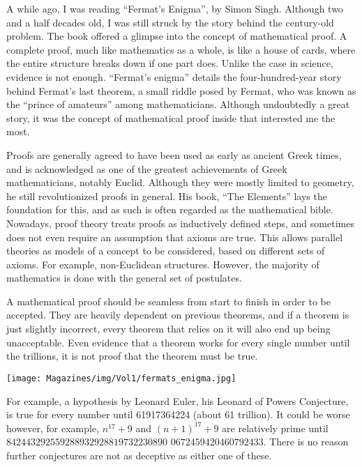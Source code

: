 \documentclass{article}
\begin{document}
\begin{multicols}{3}

A while ago, I was reading “Fermat’s Enigma”, by Simon Singh. Although two and a half decades old, I was still struck by the story behind the century-old problem. The book offered a glimpse into the concept of mathematical proof. A complete proof, much like mathematics as a whole, is like a house of cards, where the entire structure breaks down if one part does. Unlike the case in science, evidence is not enough. “Fermat’s enigma” details the four-hundred-year story behind Fermat’s last theorem, a small riddle posed by Fermat, who was known as the “prince of amateurs” among mathematicians. Although undoubtedly a great story, it was the concept of mathematical proof inside that interested me the most.

Proofs are generally agreed to have been used as early as ancient Greek times, and is acknowledged as one of the greatest achievements of Greek mathematicians, notably Euclid. Although they were mostly limited to geometry, he still revolutionized proofs in general. His book, “The Elements” lays the foundation for this, and as such is often regarded as the mathematical bible. Nowadays, proof theory treats proofs as inductively defined steps, and sometimes does not even require an assumption that axioms are true. This allows parallel theories as models of a concept to be considered, based on different sets of axioms. For example, non-Euclidean structures. However, the majority of mathematics is done with the general set of postulates.

 
A mathematical proof should be seamless from start to finish in order to be accepted. They are heavily dependent on previous theorems, and if a theorem is just slightly incorrect, every theorem that relies on it will also end up being unacceptable. Even evidence that a theorem works for every single number until the trillions, it is not proof that the theorem must be true.
\begin{center}
   \texttt{[image: Magazines/img/Vol1/fermats\_enigma.jpg]}
\end{center}
For example, a hypothesis by Leonard Euler, his Leonard of Powers Conjecture, is true for every number until 61917364224 (about 61 trillion). It could be worse however, for example, $n^{17}+9$ and $(n+1)^{17} + 9$ are relatively prime until $842443292559288932928819732230890$
$0672459420460792433$. There is no reason further conjectures are not as deceptive as either one of these. 


\end{multicols}
\end{document}
